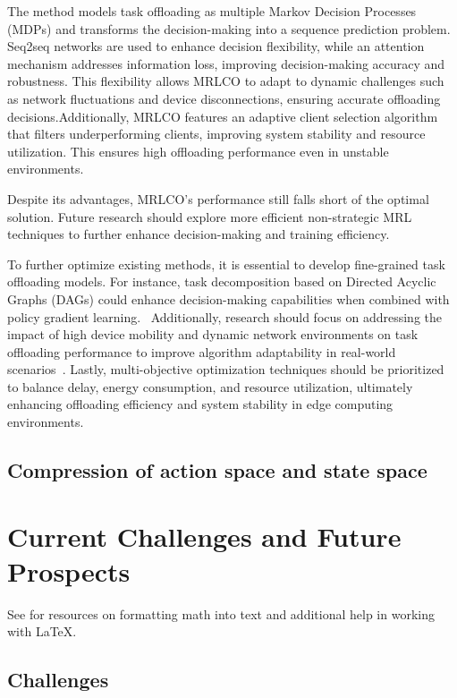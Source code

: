 \documentclass[journal]{IEEEtran}
\begin{document}
The method models task offloading as multiple Markov Decision Processes (MDPs) and transforms the decision-making into a sequence prediction problem. Seq2seq networks are used to enhance decision flexibility, while an attention mechanism addresses information loss, improving decision-making accuracy and robustness. This flexibility allows MRLCO to adapt to dynamic challenges such as network fluctuations and device disconnections, ensuring accurate offloading decisions.Additionally, MRLCO features an adaptive client selection algorithm that filters underperforming clients, improving system stability and resource utilization. This ensures high offloading performance even in unstable environments.

Despite its advantages, MRLCO's performance still falls short of the optimal solution. Future research should explore more efficient non-strategic MRL techniques to further enhance decision-making and training efficiency.~\cite{zhou05}


To further optimize existing methods, it is essential to develop fine-grained task offloading models. For instance, task decomposition based on Directed Acyclic Graphs (DAGs) could enhance decision-making capabilities when combined with policy gradient learning.~\cite{zhou03} Additionally, research should focus on addressing the impact of high device mobility and dynamic network environments on task offloading performance to improve algorithm adaptability in real-world scenarios~\cite{zhou01, zhou02}. Lastly, multi-objective optimization techniques should be prioritized to balance delay, energy consumption, and resource utilization, ultimately enhancing offloading efficiency and system stability in edge computing environments.~\cite{zhou03}

\subsection{Compression of action space and state space}

\section{Current Challenges and Future Prospects}
See for resources on formatting math into text and additional help in working with \LaTeX .

\subsection{Challenges}
\end{document}
